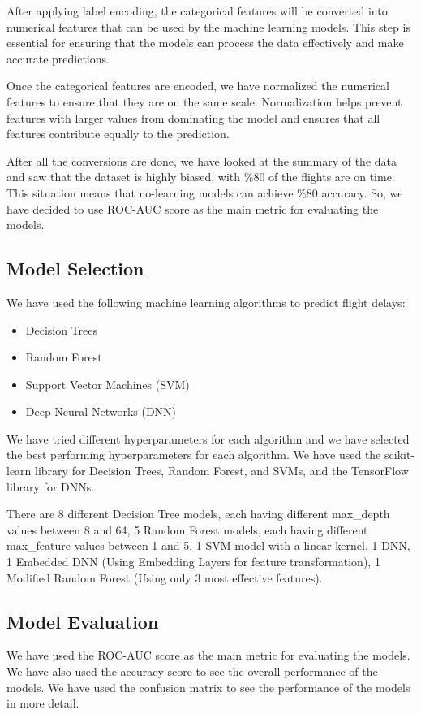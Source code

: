 \documentclass[conference]{IEEEtran}
\begin{document}
After applying label encoding, the categorical features will be converted into numerical features that can be used by the machine learning models. This step is essential for ensuring that the models can process the data effectively and make accurate predictions.

Once the categorical features are encoded, we have normalized the numerical features to ensure that they are on the same scale. Normalization helps prevent features with larger values from dominating the model and ensures that all features contribute equally to the prediction.

After all the conversions are done, we have looked at the summary of the data and saw that the dataset is highly biased, with \%80 of the flights are on time. This situation means that no-learning models can achieve \%80 accuracy. So, we have decided to use ROC-AUC score as the main metric for evaluating the models.

\subsection{Model Selection}
We have used the following machine learning algorithms to predict flight delays:

\begin{itemize}
    \item Decision Trees
    \item Random Forest
    \item Support Vector Machines (SVM)
    \item Deep Neural Networks (DNN)
\end{itemize}

We have tried different hyperparameters for each algorithm and we have selected the best performing hyperparameters for each algorithm. We have used the scikit-learn library for Decision Trees, Random Forest, and SVMs, and the TensorFlow library for DNNs.

There are 8 different Decision Tree models, each having different max\_depth values between 8 and 64,
5 Random Forest models, each having different max\_feature values between 1 and 5,
1 SVM model with a linear kernel,
1 DNN,
1 Embedded DNN (Using Embedding Layers for feature transformation),
1 Modified Random Forest (Using only 3 most effective features).

\subsection{Model Evaluation}
We have used the ROC-AUC score as the main metric for evaluating the models. We have also used the accuracy score to see the overall performance of the models. We have used the confusion matrix to see the performance of the models in more detail.
\end{document}

